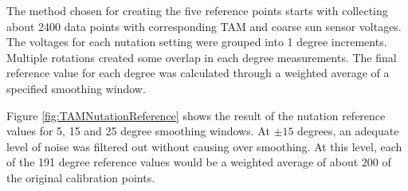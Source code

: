 The method chosen for creating the five reference points starts with collecting about 2400 data points with corresponding TAM and coarse sun sensor voltages.  The voltages for each nutation setting were grouped into 1 degree increments.  Multiple rotations created some overlap in each degree measurements.  The final reference value for each degree was calculated through a weighted average of a specified smoothing window.

Figure \ref{fig:TAMNutationReference} shows the result of the nutation reference values for 5, 15 and 25 degree smoothing windows.  At $\pm 15$ degrees, an adequate level of noise was filtered out without causing over smoothing.  At this level, each of the 191 degree reference values would be a weighted average of about 200 of the original calibration points.

